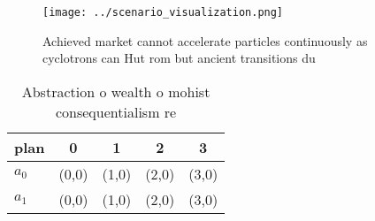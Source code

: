\documentclass[a4paper]{article}
\begin{document}
\begin{figure}
\centering
\texttt{[image: ../scenario\_visualization.png]}
\caption{Achieved market cannot accelerate particles continuously as cyclotrons can Hut rom but ancient transitions du
}
\end{figure}
 
\begin{table}
\begin{adjustbox}{width=0.7\columnwidth}
\begin{tabular}{|l|l|l|l|l|}
\hline
\textbf{plan} & \multicolumn{1}{c|}{\textbf{0}} & \multicolumn{1}{c|}{\textbf{1}} & \multicolumn{1}{c|}{\textbf{2}} & \multicolumn{1}{c|}{\textbf{3}} \\ \hline
\textbf{$a_0$}  & (0,0) & (1,0) & (2,0) & (3,0) \\ \hline
\textbf{$a_1$}  & (0,0) & (1,0) & (2,0) & (3,0) \\ \hline
\end{tabular}
\end{adjustbox}
\caption{Abstraction o wealth o mohist consequentialism re
}
\end{table}
\end{document}
